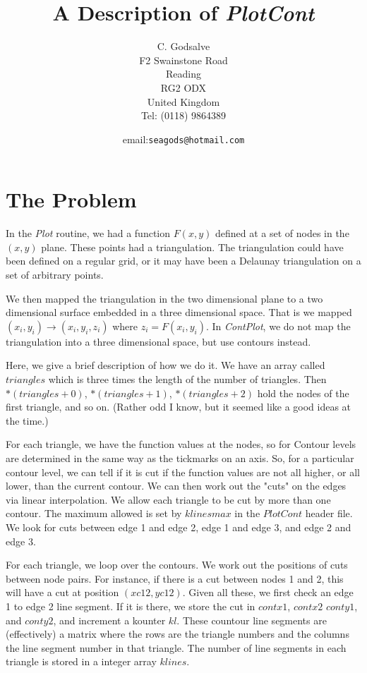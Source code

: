 \documentclass[12pt]{article}
\begin{document}
\thispagestyle{empty}

\title{A Description of {\it PlotCont}}


\author{C. Godsalve \\
F2 Swainstone Road \\
Reading\\
RG2 ODX \\
United Kingdom\\
Tel: (0118) 9864389}


\date{email:{\tt seagods@hotmail.com}}


\maketitle
\tableofcontents


\section{The Problem}

In the {\it Plot} routine, we had a function $F(x,y)$ defined at a set
of nodes in the $(x,y)$ plane. These points had a triangulation. The
triangulation could have been defined on a regular grid, or it may have
been a Delaunay triangulation on a set of arbitrary points.

We then mapped the triangulation in the two dimensional plane to
a two dimensional surface embedded in a three dimensional space.
That is we mapped $(x_i, y_i) \rightarrow (x_i,y_i,z_i)$ where
 $z_i=F(x_i, y_i)$. In {\it ContPlot},
  we do not map the triangulation into a three dimensional space, 
 but use contours instead. 

Here, we give a brief description of how we do it. We have an
array called $triangles$ which is three times the length of the
number of triangles. Then $*(triangles+0)$, $*(triangles+1)$,
 $*(triangles+2)$ hold the nodes of the first triangle, and so on.
(Rather odd I know, but it seemed like a good ideas at the time.)

For each triangle, we have the function values at the nodes, so for
Contour levels are determined in the same way as the tickmarks
on an axis. So, for a particular contour level, we can tell if
it is cut if the function values are not all higher, or all lower, than
the current contour. We can then work out the "cuts" on the edges
via linear interpolation. We allow each triangle to be cut by more 
than one contour. The maximum allowed is set by $klinesmax$ in the
$PlotCont$ header file.  We look for cuts between edge 1 and edge 2,
 edge 1 and edge 3, and edge 2 and edge 3.

For each triangle, we loop over the contours. We work out the 
positions of cuts between node pairs. For instance, if there
is a cut between nodes 1 and 2, this will have a cut at position
 $(xc12,yc12)$. Given all these, we first check an edge 1 to edge 2
line segment. If it is there, we store the cut in $contx1$, $contx2$
 $conty1$, and $conty2$, and increment a kounter $kl$. These
countour line segments are (effectively) a matrix where the rows
are the triangle numbers and the columns the line segment number
in that triangle. The number of line segments in each triangle
is stored in a integer array $klines$.
\end{document}

